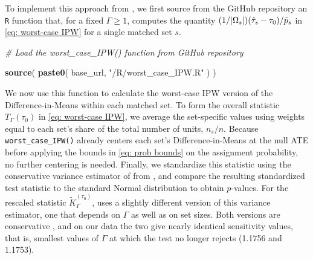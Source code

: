 \documentclass[
  12pt,
  leqno]{article}
\newenvironment{Shaded}{\begin{snugshade}}{\end{snugshade}}
\newcommand{\CommentTok}[1]{\textcolor[rgb]{0.56,0.35,0.01}{\textit{#1}}}
\newcommand{\FunctionTok}[1]{\textcolor[rgb]{0.13,0.29,0.53}{\textbf{#1}}}
\newcommand{\NormalTok}[1]{#1}
\newcommand{\StringTok}[1]{\textcolor[rgb]{0.31,0.60,0.02}{#1}}
\DeclarePairedDelimiter\abs{\lvert}{\rvert}
\begin{document}
To implement this approach from \citet{fogarty2023}, we first source
from the GitHub repository an \texttt{R} function that, for a fixed
\(\Gamma \geq 1\), computes the quantity
\((1/\abs{\Omega_s})(\hat{\tau}_s - \tau_0)/\tilde{p}_s\) in
\eqref{eq: worst-case IPW} for a single matched set \(s\).

\singlespacing

\begin{Shaded}
\begin{Highlighting}[]
\CommentTok{\# Load the worst\_case\_IPW() function from GitHub repository}

\FunctionTok{source}\NormalTok{(}
  \FunctionTok{paste0}\NormalTok{(}
\NormalTok{    base\_url, }\StringTok{"/R/worst\_case\_IPW.R"}
\NormalTok{  )}
\NormalTok{)}
\end{Highlighting}
\end{Shaded}

\doublespacing

We now use this function to calculate the worst-case IPW version of the
Difference-in-Means within each matched set. To form the overall
statistic \(T_{\Gamma}(\tau_0)\) in \eqref{eq: worst-case IPW}, we
average the set-specific values using weights equal to each set's share
of the total number of units, \(n_s/n\). Because
\texttt{worst\_case\_IPW()} already centers each set's
Difference-in-Means at the null ATE before applying the bounds in
\eqref{eq: prob bounds} on the assignment probability, no further
centering is needed. Finally, we standardize this statistic using the
conservative variance estimator of \citet{fogarty2018} from
, and compare
the resulting standardized test statistic to the standard Normal
distribution to obtain \(p\)-values. For the rescaled statistic
\(\tilde{K}_{\Gamma}^{(\tau_0)}\), \citet[p.~2202]{fogarty2023} uses a
slightly different version of this variance estimator, one that depends
on \(\Gamma\) as well as on set sizes. Both versions are conservative
\citep[Proposition 1]{fogarty2018}, and on our data the two give nearly
identical sensitivity values, that is, smallest values of \(\Gamma\) at
which the test no longer rejects (1.1756 and 1.1753).

\singlespacing
\end{document}
